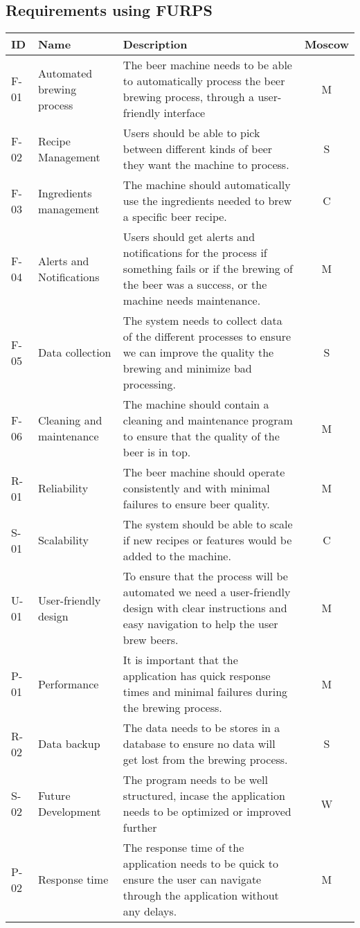 \subsection{Requirements using FURPS}
\begin{center}
    \sloppy
    \begin{longtable}{|p{1cm}|p{4cm}|p{8.5cm}|c|}
        \hline
        ID & Name & Description & Moscow \\ \hline
        F-01   & Automated brewing process & The beer machine needs to be able to automatically process the beer brewing process, through a user-friendly interface & M \\ \hline
        F-02   & Recipe Management & Users should be able to pick between different kinds of beer they want the machine to process. & S \\ \hline
        F-03   & Ingredients management & The machine should automatically use the ingredients needed to brew a specific beer recipe. & C \\ \hline
        F-04   & Alerts and Notifications & Users should get alerts and notifications for the process if something fails or if the brewing of the beer was a success, or the machine needs maintenance. & M \\ \hline
        F-05  & Data collection & The system needs to collect data of the different processes to ensure we can improve the quality the brewing and minimize bad processing. & S \\ \hline
        F-06   & Cleaning and maintenance & The machine should contain a cleaning and maintenance program to ensure that the quality of the beer is in top.& M \\ \hline
        R-01   & Reliability & The beer machine should operate consistently and with minimal failures to ensure beer quality. & M \\ \hline
        S-01   & Scalability & The system should be able to scale if new recipes or features would be added to the machine. & C \\ \hline
        U-01  & User-friendly design & To ensure that the process will be automated we need a user-friendly design with clear instructions and easy navigation to help the user brew beers. & M \\ \hline
        P-01   & Performance & It is important that the application has quick response times and minimal failures during the brewing process. & M \\ \hline
        R-02  & Data backup & The data needs to be stores in a database to ensure no data will get lost from the brewing process. & S \\ \hline
        S-02   & Future Development & The program needs to be well structured, incase the application needs to be optimized or improved further & W \\ \hline
        P-02   & Response time & The response time of the application needs to be quick to ensure the user can navigate through the application without any delays. & M \\ \hline


\end{longtable}
\end{center}
